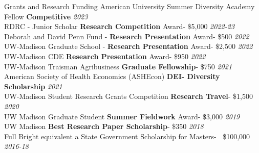 \documentclass{resume} %
\begin{document}

\begin{rSection}{Grants and Research Funding}
American University Summer Diversity Academy Fellow \textbf{Competitive} \hfill \textit{2023}	\\
RDRC - Junior Scholar \textbf{Research Competition} Award- \$5,000 \hfill \textit{2022-23}	\\
Deborah and David Penn Fund - \textbf{Research Presentation} Award- \$500 \hfill \textit{2022}	\\
UW-Madison Graduate School - \textbf{Research Presentation} Award- \$2,500 \hfill \textit{2022}	\\
UW-Madison CDE \textbf{Research Presentation} Award- \$950 \hfill \textit{2022} \\
UW-Madison Traisman Agribusiness \textbf{Graduate Fellowship}- \$750 \hfill \textit{2021}	\\
American Society of Health Economics (ASHEcon) \textbf{DEI- Diversity Scholarship} \hfill \textit{2021}\\
UW-Madison Student Research Grants Competition \textbf{Research Travel}- \$1,500 \hfill \textit{2020}  \\
UW Madison Graduate Student \textbf{Summer Fieldwork} Award- \$3,000  \hfill \textit{2019}\\
UW Madison \textbf{Best Research Paper Scholarship}- \$350 \hfill \textit{2018} \\
Full Bright equivalent a State Government Scholarship for Masters- $~$ \$100,000 \hfill \textit{2016-18}

\end{rSection}

\end{document}

